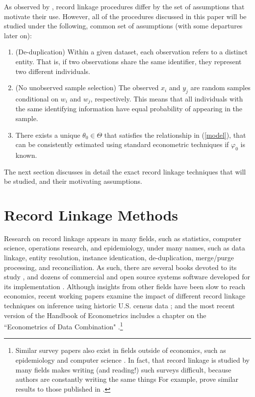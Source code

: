 \documentclass[12pt]{article}
\begin{document}
As observed by \cite{bailey2017}, record linkage procedures differ by the set of assumptions that motivate their use.  However, all of the procedures discussed in this paper will be studied under the following, common set of assumptions (with some departures later on):
\begin{enumerate}
\item (De-duplication) Within a given dataset, each observation refers to a distinct entity.  That is, if two observations share the same identifier, they represent two different individuals.
\item (No unobserved sample selection) The observed $x_i$ and $y_j$ are random samples conditional on $w_i$ and $w_j$, respectively.  This means that all individuals with the same identifying information have equal probability of appearing in the sample. 
\item There exists a unique $\theta_0 \in \Theta$ that satisfies the relationship in (\ref{model}), that can be consistently estimated using standard econometric techniques if $\varphi_0$ is known.
\end{enumerate}

The next section discusses in detail the exact record linkage techniques that will be studied, and their motivating assumptions.


\section{Record Linkage Methods}

Research on record linkage appears in many fields, such as statistics, computer science, operations research, and epidemiology, under many names, such as data linkage, entity resolution, instance identication, de-duplication, merge/purge processing, and reconciliation.  As such, there are several books devoted to its study \citep{harron_book, christen2012, herzog07}, and dozens of commercial and open source systems software developed for its implementation \citep{kopcke2010}.  Although insights from other fields have been slow to reach economics, recent working papers examine the impact of different record linkage techniques on inference using historic U.S. census data \citep{abe2019, bailey2017}; and the most recent version of the Handbook of Econometrics includes a chapter on the ``Econometrics of Data Combination" \citep{RidderMoffitt}.\footnote{Similar survey papers also exist in fields outside of economics, such as epidemiology and computer science \citep{harron2018, winkler99}.  In fact, that record linkage is studied by many fields makes writing (and reading!) such surveys difficult, because authors are constantly writing the same things For example, \cite{Goldstein2012} prove similar results to those published in \cite{hirukawa2018}.}
\end{document}
